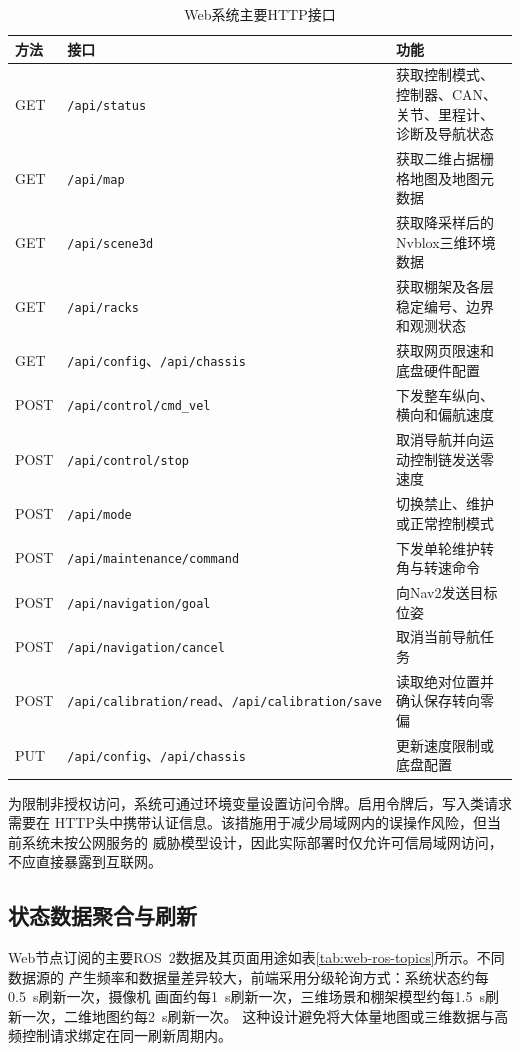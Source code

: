 \documentclass[UTF8,12pt,a4paper,openany]{ctexbook}
\begin{document}
\begin{table}[htbp]
    \centering
    \caption{Web系统主要HTTP接口}
    \label{tab:web-api}
    \begin{tabularx}{\textwidth}{p{1.4cm}p{5.1cm}X}
        \toprule
        方法 & 接口 & 功能 \\
        \midrule
        GET & \texttt{/api/status} & 获取控制模式、控制器、CAN、关节、里程计、诊断及导航状态 \\
        GET & \texttt{/api/map} & 获取二维占据栅格地图及地图元数据 \\
        GET & \texttt{/api/scene3d} & 获取降采样后的Nvblox三维环境数据 \\
        GET & \texttt{/api/racks} & 获取棚架及各层稳定编号、边界和观测状态 \\
        GET & \texttt{/api/config}、\texttt{/api/chassis} & 获取网页限速和底盘硬件配置 \\
        POST & \texttt{/api/control/cmd\_vel} & 下发整车纵向、横向和偏航速度 \\
        POST & \texttt{/api/control/stop} & 取消导航并向运动控制链发送零速度 \\
        POST & \texttt{/api/mode} & 切换禁止、维护或正常控制模式 \\
        POST & \texttt{/api/maintenance/command} & 下发单轮维护转角与转速命令 \\
        POST & \texttt{/api/navigation/goal} & 向Nav2发送目标位姿 \\
        POST & \texttt{/api/navigation/cancel} & 取消当前导航任务 \\
        POST & \texttt{/api/calibration/read}、\texttt{/api/calibration/save} & 读取绝对位置并确认保存转向零偏 \\
        PUT & \texttt{/api/config}、\texttt{/api/chassis} & 更新速度限制或底盘配置 \\
        \bottomrule
    \end{tabularx}
\end{table}

为限制非授权访问，系统可通过环境变量设置访问令牌。启用令牌后，写入类请求需要在
HTTP头中携带认证信息。该措施用于减少局域网内的误操作风险，但当前系统未按公网服务的
威胁模型设计，因此实际部署时仅允许可信局域网访问，不应直接暴露到互联网。

\subsection{状态数据聚合与刷新}

Web节点订阅的主要ROS~2数据及其页面用途如表\ref{tab:web-ros-topics}所示。不同数据源的
产生频率和数据量差异较大，前端采用分级轮询方式：系统状态约每0.5~s刷新一次，摄像机
画面约每1~s刷新一次，三维场景和棚架模型约每1.5~s刷新一次，二维地图约每2~s刷新一次。
这种设计避免将大体量地图或三维数据与高频控制请求绑定在同一刷新周期内。
\end{document}
